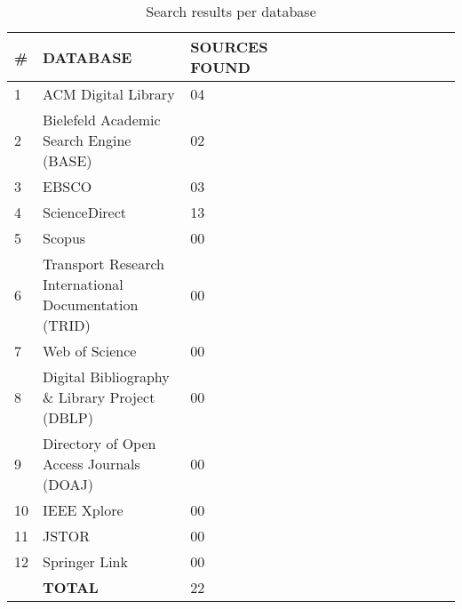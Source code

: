 \begin{table*}[h]
\begin{center}
\caption{Search results per database}
\small
\begin{tabular}{*{15}{l}}
\hline
\multicolumn{1}{l}{\#} & \textbf{DATABASE}                                     & \multicolumn{1}{l}{\textbf{SOURCES FOUND}} \\ \hline
1  & ACM Digital Library                      & 04 \\
2  & Bielefeld Academic Search Engine (BASE)  & 02  \\
3  & EBSCO                                    & 03 \\
4  & ScienceDirect                            & 13 \\
5  & Scopus                                   & 00  \\
6                      & Transport Research International Documentation (TRID) & 00                                          \\
7  & Web of Science                           & 00  \\
8                      & Digital Bibliography \& Library Project (DBLP)        & 00                                          \\
9 & Directory of Open Access Journals (DOAJ) & 00  \\
10 & IEEE Xplore                              & 00  \\
11 & JSTOR                                    & 00  \\
12 & Springer Link                                         & 00                     \\ \hline
   & \textbf{TOTAL}                                        & 22                   \\ \hline
\end{tabular}
\label{table*:results}
\end{center}
\end{table*} 